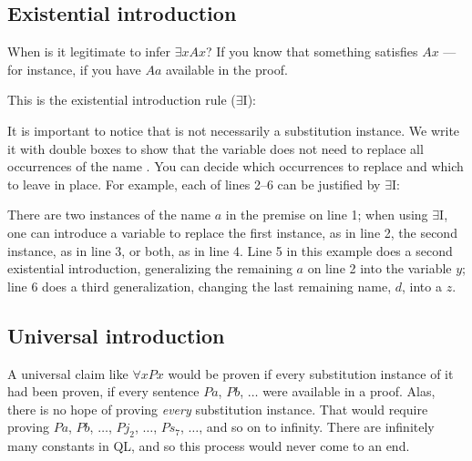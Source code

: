 \subsection{Existential introduction}

When is it legitimate to infer $\exists x Ax$? If you know that something satisfies $Ax$ --- for instance, if you have $Aa$ available in the proof.

This is the existential introduction rule ($\exists$I):

\begin{ndproof}
	 
\end{ndproof}

It is important to notice that \metaA{} is not necessarily a substitution instance. We write it with double boxes to show that the variable  does not need to replace all occurrences of the name . You can decide which occurrences to replace and which to leave in place. For example, each of lines 2--6 can be justified by $\exists${}I:


\begin{ndproof}
	 
	 
	 
	 
	 
\end{ndproof}

There are two instances of the name $a$ in the premise on line 1; when using $\exists${}I, one can introduce a variable to replace the first instance, as in line 2, the second instance, as in line 3, or both, as in line 4. Line 5 in this example does a second existential introduction, generalizing the remaining $a$ on line 2 into the variable $y$; line 6 does a third generalization, changing the last remaining name, $d$, into a $z$.

\subsection{Universal introduction}
A universal claim like $\forall x Px$ would be proven if {every} substitution instance of it had been proven, if every sentence $Pa$, $Pb$, $\ldots$ were available in a proof. Alas, there is no hope of proving \emph{every} substitution instance. That would require proving $Pa$, $Pb$, $\ldots$, $Pj_2$, $\ldots$, $Ps_7$, $\ldots$, and so on to infinity. There are infinitely many constants in QL, and so this process would never come to an end.


